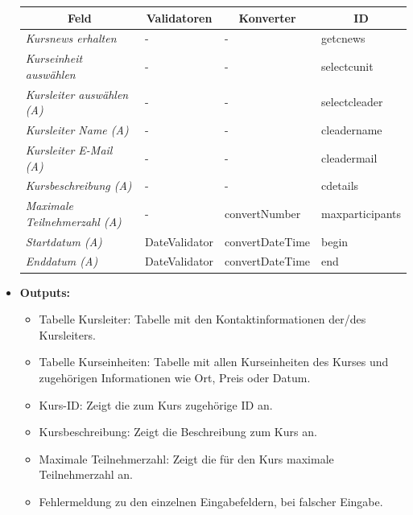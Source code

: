 \begin{itemize}
\begin{center}
\begin{longtable}{|p{3cm} |p{4cm} | p{4cm}|p{3cm} ||}
						\hline \multicolumn{1}{|c|}{\textbf{Feld}} & \multicolumn{1}{|c|}{\textbf{Validatoren}}  &  \multicolumn{1}{|c|}{\textbf{Konverter}} &  \multicolumn{1}{|c|}{\textbf{ID}} \\ \hline
						\endfirsthead
						\hline
						\endlastfoot
						\textit{Kursnews erhalten} & - & - & getcnews\\ \hline
						\textit{Kurseinheit auswählen} & - & - & selectcunit\\ \hline
						\textit{Kursleiter auswählen (A)} & - & - & selectcleader\\ \hline
						\textit{Kursleiter Name (A)} & - & - & cleadername\\ \hline
						\textit{Kursleiter E-Mail (A)} & - & - & cleadermail\\ \hline
						\textit{Kursbeschreibung (A)} & - & - & cdetails\\ \hline
						\textit{Maximale Teilnehmerzahl (A)} & - & convertNumber & maxparticipants\\ \hline
						\textit{Startdatum (A)} & DateValidator & convertDateTime & begin\\ \hline
						\textit{Enddatum (A)} & DateValidator & convertDateTime & end\\ \hline
					\end{longtable}
				\end{center}
			\item \textbf{Outputs:}
			\begin{itemize}
				\item Tabelle Kursleiter: Tabelle mit den Kontaktinformationen der/des Kursleiters.
				\item Tabelle Kurseinheiten: Tabelle mit allen Kurseinheiten des Kurses und zugehörigen Informationen wie Ort, Preis oder Datum.
				\item Kurs-ID: Zeigt die zum Kurs zugehörige ID an.
				\item Kursbeschreibung: Zeigt die Beschreibung zum Kurs an.
				\item Maximale Teilnehmerzahl: Zeigt die für den Kurs maximale Teilnehmerzahl an.
				\item Fehlermeldung zu den einzelnen Eingabefeldern, bei falscher Eingabe.
			\end{itemize}
					\begin{center}
						\begin{longtable}{|p{5cm} | p{4cm}|p{3cm}|}
							

\end{longtable}
\end{center}
\end{itemize}
